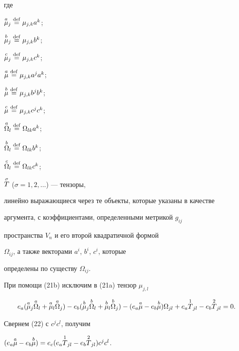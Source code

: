 где 


$\overset{a}{\mu}{}_j\overset{\mathrm{def}}{=}{}\mu_{j,k}a^k$;


$\overset{b}{\mu}{}_j\overset{\mathrm{def}}{=}{}\mu_{j,k}b^k$; 


$\overset{c}{\mu}{}_j\overset{\mathrm{def}}{=}{}\mu_{j,k}c^k$; 


$\overset{a}{\mu}{}\overset{\mathrm{def}}{=}{}\mu_{j,k}a^ja^k$; 


$\overset{b}{\mu}{}\overset{\mathrm{def}}{=}{}\mu_{j,k}b^jb^k$; 


$\overset{c}{\mu}{}\overset{\mathrm{def}}{=}{}\mu_{j,k}c^jc^k$;


$\overset{a}{\Omega}{}_l\overset{\mathrm{def}}{=}{}\Omega_{lk}a^k$;


$\overset{b}{\Omega}{}_l\overset{\mathrm{def}}{=}{}\Omega_{lk}b^k$; 


$\overset{c}{\Omega}{}_l\overset{\mathrm{def}}{=}{}\Omega_{lk}c^k$; 


$\overset{\sigma}{T}{}$ ($\sigma =1,2,\dotsc $) --- тензоры,


линейно выражающиеся через те объекты, которые указаны в качестве


аргумента, с коэффициентами, определенными метрикой $g_{ij}$


пространства $V_n$ и его второй квадратичной формой 


$\Omega_{ij}$, а также векторами $a^i$, $b^i$, $c^i$, которые


определены по существу $\Omega_{ij}$.


\addtocounter{equation}{1}





При помощи (21b) исключим в (21a) тензор $\mu_{j,l}$


\begin{equation}


e_a(\up{a}{\mu}_j\up{a}{\Omega}_l+\up{a}{\mu}_l\up{a}{\Omega}_j)-


e_b(\up{b}{\mu}_j\up{b}{\Omega}_l+\up{b}{\mu}_l\up{b}{\Omega}_j) -


(e_a\up{a}{\mu}-e_b\up{b}{\mu}) \Omega_{jl}+


e_a\up{1}{T}_{jl}-e_b\up{2}{T}_{jl}=0.


\end{equation}


Свернем (22) с $c^jc^l$, получим


$(e_a\up{a}{\mu}-e_b\up{b}{\mu})=e_c 


(e_a\up{1}{T}_{jl}-e_b\up{2}{T}_{jl})c^jc^l$.


